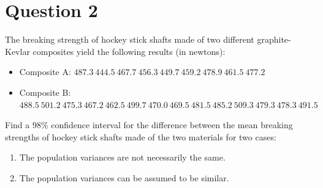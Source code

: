 \documentclass[13pt]{article}
\begin{document}
\newpage
\section*{Question 2}
The breaking strength of hockey stick shafts made of two different graphite-Kevlar
composites yield the following results (in newtons):
\begin{itemize}
\item Composite A: $487.3 \ 444.5 \ 467.7 \ 456.3 \ 449.7 \ 459.2 \ 478.9 \ 461.5 \ 477.2$
\item Composite B: $488.5 \ 501.2 \ 475.3 \ 467.2 \ 462.5 \ 499.7 \ 470.0 \ 469.5 \ 481.5 \ 485.2
  \ 509.3 \ 479.3 \ 478.3 \ 491.5$
\end{itemize}
Find a $98\%$ confidence interval for the difference between the mean breaking strengths of hockey stick
shafts made of the two materials for two cases:
\begin{enumerate}[label=(\alph*)]
\item The population variances are not necessarily the same.
\item The population variances can be assumed to be similar.
\end{enumerate}
\end{document}
